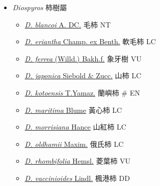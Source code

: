 
  \begin{itemize}
 \item[] \textit{Diospyros} 柿樹屬
                                
  \begin{itemize}
        \item[] \href{http://www.theplantlist.org/tpl1.1/search?q=Diospyros+blancoi}{\textit{D. blancoi} A. DC.}   毛柿   NT
        \item[] \href{http://www.theplantlist.org/tpl1.1/search?q=Diospyros+eriantha}{\textit{D. eriantha} Champ. ex Benth.}   軟毛柿   LC
        \item[] \href{http://www.theplantlist.org/tpl1.1/search?q=Diospyros+ferrea}{\textit{D. ferrea} (Willd.) Bakh.f.}   象牙樹   VU
        \item[] \href{http://www.theplantlist.org/tpl1.1/search?q=Diospyros+japonica}{\textit{D. japonica} Siebold \& Zucc.}   山柿   LC
        \item[] \href{http://www.theplantlist.org/tpl1.1/search?q=Diospyros+kotoensis}{\textit{D. kotoensis} T.Yamaz.}   蘭嶼柿  \# EN
        \item[] \href{http://www.theplantlist.org/tpl1.1/search?q=Diospyros+maritima}{\textit{D. maritima} Blume}   黃心柿   LC
        \item[] \href{http://www.theplantlist.org/tpl1.1/search?q=Diospyros+morrisiana}{\textit{D. morrisiana} Hance}   山紅柿   LC
        \item[] \href{http://www.theplantlist.org/tpl1.1/search?q=Diospyros+oldhamii}{\textit{D. oldhamii} Maxim.}   俄氏柿   LC
        \item[] \href{http://www.theplantlist.org/tpl1.1/search?q=Diospyros+rhombifolia}{\textit{D. rhombifolia} Hemsl.}   菱葉柿   VU
        \item[] \href{http://www.theplantlist.org/tpl1.1/search?q=Diospyros+vaccinioides}{\textit{D. vaccinioides} Lindl.}   楓港柿   DD
  \end{itemize}
  \end{itemize}
